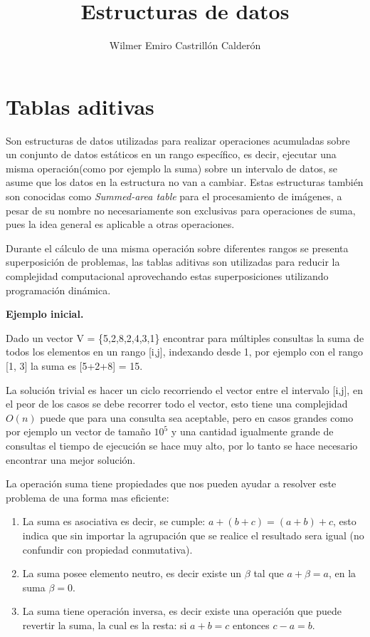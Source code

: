 \documentclass[12pt, a4paper]{article}
\title{\textbf{Estructuras de datos}}
\author{Wilmer Emiro Castrillón Calderón}
\newcommand{\subtitulo}[1]{\begin{center}\textbf{#1}\end{center}}
\begin{document}
	\maketitle
	
	\section{Tablas aditivas}
	Son estructuras de datos utilizadas para realizar operaciones acumuladas sobre un conjunto de datos estáticos
	en un rango específico, es decir, ejecutar una misma operación(como por ejemplo la suma) sobre un intervalo
	de datos, se asume que los datos en la estructura no van a cambiar. Estas estructuras también son conocidas como
	\textit{Summed-area table} para el procesamiento de imágenes, a pesar de su nombre no necesariamente son 
	exclusivas para operaciones de suma, pues la idea general es aplicable a otras operaciones.
	
	Durante el cálculo de una misma operación sobre diferentes rangos se presenta superposición de problemas, las 
	tablas aditivas son utilizadas para reducir la complejidad computacional aprovechando estas superposiciones
	utilizando programación dinámica.
	
	\subtitulo{Ejemplo inicial.}
	
	Dado un vector V = \{5,2,8,2,4,3,1\} encontrar para múltiples consultas la suma de todos los elementos en un rango
	[i,j], indexando desde 1, por ejemplo con el rango [1, 3] la suma es [5+2+8] = 15.
	
	La solución trivial es hacer un ciclo recorriendo el vector entre el intervalo [i,j], en el peor de los casos se
	debe recorrer todo el vector, esto tiene una complejidad $O(n)$ puede que para una consulta sea aceptable, pero
	en casos grandes como por ejemplo un vector de tamaño $10^{5}$ y una cantidad igualmente grande de consultas el
	tiempo de ejecución se hace muy alto, por lo tanto se hace necesario encontrar una mejor solución.	
	
	La operación suma tiene propiedades que nos pueden ayudar a resolver este problema de una forma mas eficiente:
	\begin{enumerate}[1.]
		\item La suma es asociativa es decir, se cumple: $a+(b+c)=(a+b)+c$, esto indica que sin importar 
			la agrupación que se realice el resultado sera igual (no confundir con propiedad conmutativa).
		\item La suma posee elemento neutro, es decir existe un $\beta$ tal que $a + \beta = a$, en la suma 
			$\beta = 0$.
		\item La suma tiene operación inversa, es decir existe una operación que puede revertir la suma, la cual 
			es la resta: si $a+b=c$ entonces $c-a=b$.
	\end{enumerate}
	
\end{document}
